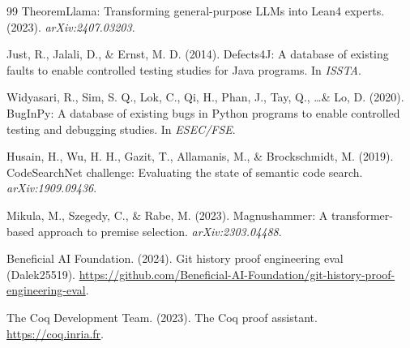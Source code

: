 \documentclass[11pt]{article}
\begin{document}
\begin{thebibliography}{99}
TheoremLlama: Transforming general-purpose LLMs into Lean4 experts. (2023). \textit{arXiv:2407.03203}.

Just, R., Jalali, D., \& Ernst, M. D. (2014). Defects4J: A database of existing faults to enable controlled testing studies for Java programs. In \textit{ISSTA}.

Widyasari, R., Sim, S. Q., Lok, C., Qi, H., Phan, J., Tay, Q., \ldots \& Lo, D. (2020). BugInPy: A database of existing bugs in Python programs to enable controlled testing and debugging studies. In \textit{ESEC/FSE}.

Husain, H., Wu, H. H., Gazit, T., Allamanis, M., \& Brockschmidt, M. (2019). CodeSearchNet challenge: Evaluating the state of semantic code search. \textit{arXiv:1909.09436}.

Mikula, M., Szegedy, C., \& Rabe, M. (2023). Magnushammer: A transformer-based approach to premise selection. \textit{arXiv:2303.04488}.

Beneficial AI Foundation. (2024). Git history proof engineering eval (Dalek25519). \url{https://github.com/Beneficial-AI-Foundation/git-history-proof-engineering-eval}.

The Coq Development Team. (2023). The Coq proof assistant. \url{https://coq.inria.fr}.

\end{thebibliography}
\end{document}
